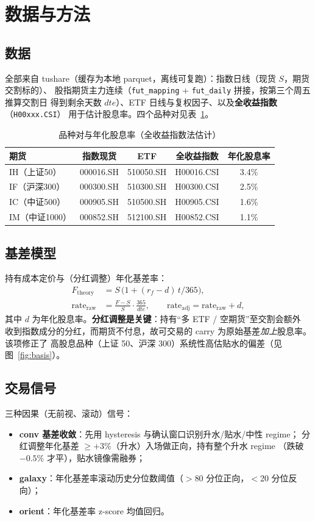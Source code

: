 \documentclass[11pt]{ctexart}
\newcommand{\pct}[1]{#1\%}
\begin{document}
\section{数据与方法}

\subsection{数据}
全部来自 tushare（缓存为本地 parquet，离线可复跑）：指数日线（现货 $S$，期货交割标的）、
股指期货主力连续（\texttt{fut\_mapping} + \texttt{fut\_daily} 拼接，按第三个周五推算交割日
得到剩余天数 $dte$）、ETF 日线与复权因子、以及\textbf{全收益指数}（\texttt{H00xxx.CSI}）
用于估计股息率。四个品种对见表~\ref{tab:pairs}。

\begin{table}[h]\centering\small
\caption{品种对与年化股息率（全收益指数法估计）}\label{tab:pairs}
\begin{tabular}{lcccc}
\toprule
期货 & 指数现货 & ETF & 全收益指数 & 年化股息率 \\
\midrule
IH（上证50）  & 000016.SH & 510050.SH & H00016.CSI & \pct{3.4} \\
IF（沪深300） & 000300.SH & 510300.SH & H00300.CSI & \pct{2.5} \\
IC（中证500） & 000905.SH & 510500.SH & H00905.CSI & \pct{1.6} \\
IM（中证1000）& 000852.SH & 512100.SH & H00852.CSI & \pct{1.1} \\
\bottomrule
\end{tabular}
\end{table}

\subsection{基差模型}
持有成本定价与（分红调整）年化基差率：
\begin{align}
F_{\text{theory}} &= S\,\bigl(1 + (r_f - d)\,t/365\bigr), \\
\text{rate}_{\text{raw}} &= \frac{F - S}{S}\cdot\frac{365}{dte},\qquad
\text{rate}_{\text{adj}} = \text{rate}_{\text{raw}} + d ,
\end{align}
其中 $d$ 为年化股息率。\textbf{分红调整是关键}：持有``多 ETF / 空期货''至交割会额外
收到指数成分的分红，而期货不付息，故可交易的 carry 为原始基差\emph{加上}股息率。该项修正了
高股息品种（上证 50、沪深 300）系统性高估贴水的偏差（见图~\ref{fig:basis}）。

\subsection{交易信号}
三种因果（无前视、滚动）信号：
\begin{itemize}\setlength\itemsep{1pt}
  \item \textbf{conv 基差收敛}：先用 hysteresis 与确认窗口识别升水/贴水/中性 regime；
        分红调整年化基差 $\geq +3\%$（升水）入场做正向，持有整个升水 regime
        （跌破 $-0.5\%$ 才平），贴水镜像需融券；
  \item \textbf{galaxy}：年化基差率滚动历史分位数阈值（$>$80 分位正向，$<$20 分位反向）；
  \item \textbf{orient}：年化基差率 z-score 均值回归。
\end{itemize}
\end{document}
